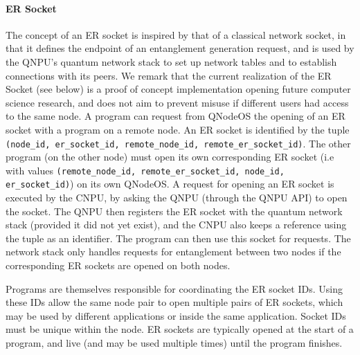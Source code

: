 \paragraph{ER Socket}
\label{sec:design_er_socket}
The concept of an \ac{ER} socket is inspired by that of a classical network socket, in that it defines the endpoint of an entanglement generation request, and is used by the \ac{QNPU}'s quantum network stack to set up network tables and to establish connections with its peers. 
We remark that the current realization of the \ac{ER} Socket (see below) is a proof of concept implementation opening future computer science research, and does not aim to prevent misuse if different users had access to the same node. 
A program can request from QNodeOS the opening of an \ac{ER} socket with a program on a remote node. An \ac{ER} socket is identified by the tuple \texttt{(node\_id, er\_socket\_id, remote\_node\_id, remote\_er\_socket\_id)}. The other program (on the other node) must open its own corresponding \ac{ER} socket (i.e with values \texttt{(remote\_node\_id, remote\_er\_socket\_id, node\_id, er\_socket\_id)}) on its own QNodeOS. A request for opening an \ac{ER} socket is executed by the CNPU, by asking the QNPU (through the QNPU API) to open the socket. The QNPU then registers the ER socket with the quantum network stack (provided it did not yet exist), and the CNPU also keeps a reference using the tuple as an identifier. The program can then use this socket for requests. The network stack only handles requests for entanglement between two nodes if the corresponding \ac{ER} sockets are opened on both nodes.

Programs are themselves responsible for coordinating the ER socket IDs. Using these IDs allow the same node pair to open multiple pairs of ER sockets, which may be used by different applications or inside the same application. Socket IDs must be unique within the node. \ac{ER} sockets are typically opened at the start of a program, and live (and may be used multiple times) until the program finishes.

